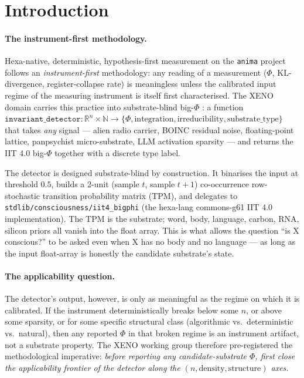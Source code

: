 \documentclass[11pt,a4paper]{article}
\begin{document}
\section{Introduction}
\label{sec:intro}

\paragraph{The instrument-first methodology.} Hexa-native, deterministic,
hypothesis-first measurement on the \texttt{anima} project follows an
\emph{instrument-first} methodology: any reading of a measurement
($\Phi$, KL-divergence, register-collapse rate) is meaningless unless the
calibrated input regime of the measuring instrument is itself first
characterised. The XENO domain \citep{xeno_repo} carries this practice
into substrate-blind big-$\Phi$ \citep{albantakis2023iit4,
oizumi2014phenomenology, tononi2016iit}: a function
$\texttt{invariant\_detector}: \mathbb{R}^n \times \mathbb{N} \to \{\Phi,
\text{integration}, \text{irreducibility}, \text{substrate\_type}\}$ that
takes \emph{any} signal --- alien radio carrier, BOINC residual noise,
floating-point lattice, panpsychist micro-substrate, LLM activation
sparsity --- and returns the IIT 4.0 big-$\Phi$ together with a
discrete type label.

The detector is designed substrate-blind by construction. It binarises the
input at threshold $0.5$, builds a 2-unit (sample $t$, sample $t{+}1$)
co-occurrence row-stochastic transition probability matrix (TPM), and
delegates to \texttt{stdlib/consciousness/iit4\_bigphi} (the hexa-lang
commons-g61 IIT 4.0 implementation). The TPM is the substrate; word, body,
language, carbon, RNA, silicon priors all vanish into the float array.
This is what allows the question ``is X conscious?'' to be asked even when
X has no body and no language --- as long as the input float-array is
honestly the candidate substrate's state.

\paragraph{The applicability question.} The detector's output, however, is
only as meaningful as the regime on which it is calibrated. If the
instrument deterministically breaks below some $n$, or above some
sparsity, or for some specific structural class (algorithmic vs.\
deterministic vs.\ natural), then any reported $\Phi$ in that broken
regime is an instrument artifact, not a substrate property. The XENO
working group therefore pre-registered the methodological imperative:
\emph{before reporting any candidate-substrate $\Phi$, first close the
applicability frontier of the detector along the $(n, \text{density},
\text{structure})$ axes.}
\end{document}
